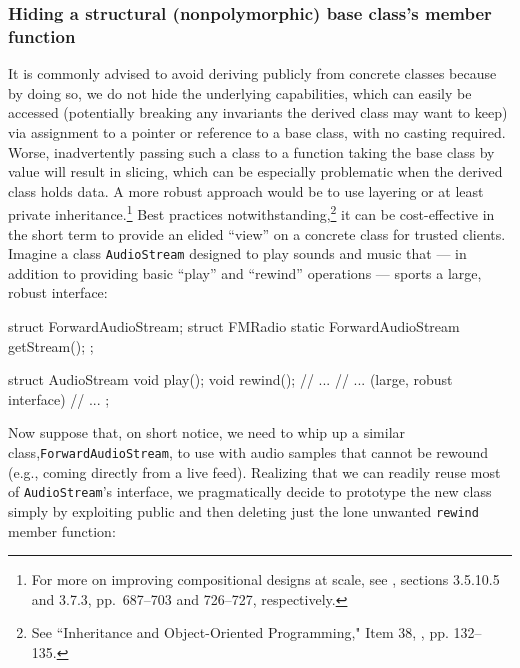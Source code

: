 \subsubsection[Hiding a structural (nonpolymorphic) base class's member function]{Hiding a structural (nonpolymorphic) base class’s member function}\label{hiding-a-structural-(nonpolymorphic)-base-class's-member-function}

It is commonly advised to avoid deriving publicly from concrete classes because by doing so, we do not hide the underlying capabilities, which can easily be accessed (potentially breaking any invariants the derived class may want to keep) via assignment to a pointer or reference to a base class, with no casting required.  Worse, inadvertently passing such a class to a function taking the base class by value will result in slicing, which can be especially problematic when the derived class holds data. A more robust approach would be to use layering or at least private inheritance.\footnote{For more on improving compositional designs at scale, see
  \cite{lakos20}, sections 3.5.10.5 and 3.7.3, pp.~687--703 and
  726--727, respectively.} Best practices notwithstanding,\footnote{See ``Inheritance and Object-Oriented Programming," Item 38, \cite{meyers92}, pp. 132--135.} it can be cost-effective in the short
term to provide an elided ``view'' on a concrete class for trusted
clients. Imagine a class \lstinline!AudioStream! designed to play sounds
and music that --- in addition to providing basic ``play'' and
``rewind'' operations --- sports a large, robust interface:

\begin{emcppshiddenlisting}[emcppsbatch=e2]
struct ForwardAudioStream;
struct FMRadio {
    static ForwardAudioStream getStream();
};
\end{emcppshiddenlisting}
\begin{emcppslisting}[emcppsbatch=e2]
struct AudioStream
{
    void play();
    void rewind();
    // ...
    // ... (large, robust interface)
    // ...
};
\end{emcppslisting}


Now suppose that, on short notice, we need to whip up a similar
class,\linebreak[4] \lstinline!ForwardAudioStream!, to use with audio samples that
cannot be rewound (e.g., coming directly from a live feed). Realizing
that we can readily reuse most of \lstinline!AudioStream!'s interface, we
pragmatically decide to prototype the new class simply by exploiting
public  and then deleting just the lone
unwanted \lstinline!rewind! member function:


